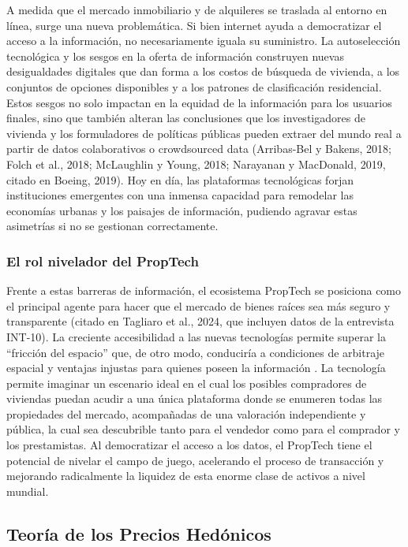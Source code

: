 A medida que el mercado inmobiliario y de alquileres se traslada al entorno en línea, surge una nueva problemática. Si bien internet ayuda a democratizar el acceso a la información, no necesariamente iguala su suministro. La autoselección tecnológica y los sesgos en la oferta de información construyen nuevas desigualdades digitales que dan forma a los costos de búsqueda de vivienda, a los conjuntos de opciones disponibles y a los patrones de clasificación residencial. Estos sesgos no solo impactan en la equidad de la información para los usuarios finales, sino que también alteran las conclusiones que los investigadores de vivienda y los formuladores de políticas públicas pueden extraer del mundo real a partir de datos colaborativos o crowdsourced data (Arribas-Bel y Bakens, 2018; Folch et al., 2018; McLaughlin y Young, 2018; Narayanan y MacDonald, 2019, citado en Boeing, 2019). Hoy en día, las plataformas tecnológicas forjan instituciones emergentes con una inmensa capacidad para remodelar las economías urbanas y los paisajes de información, pudiendo agravar estas asimetrías si no se gestionan correctamente.

\subsubsection{El rol nivelador del PropTech}

Frente a estas barreras de información, el ecosistema PropTech se posiciona como el principal agente para hacer que el mercado de bienes raíces sea más seguro y transparente (citado en Tagliaro et al., 2024, que incluyen datos de la entrevista INT-10). La creciente accesibilidad a las nuevas tecnologías permite superar la ``fricción del espacio'' que, de otro modo, conduciría a condiciones de arbitraje espacial y ventajas injustas para quienes poseen la información \parencite{SiniakEtAl2020}. La tecnología permite imaginar un escenario ideal en el cual los posibles compradores de viviendas puedan acudir a una única plataforma donde se enumeren todas las propiedades del mercado, acompañadas de una valoración independiente y pública, la cual sea descubrible tanto para el vendedor como para el comprador y los prestamistas. Al democratizar el acceso a los datos, el PropTech tiene el potencial de nivelar el campo de juego, acelerando el proceso de transacción y mejorando radicalmente la liquidez de esta enorme clase de activos a nivel mundial.

\subsection{Teoría de los Precios Hedónicos}

